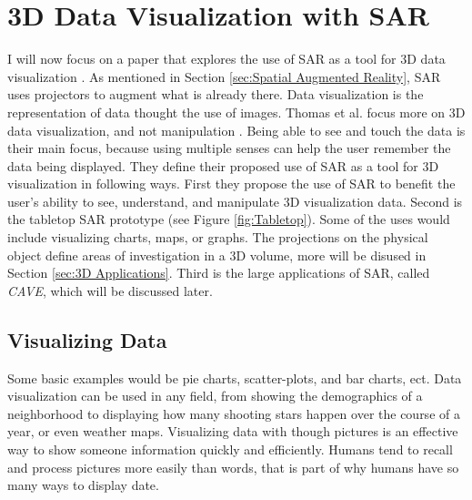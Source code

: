 \documentclass{sig-alternate}
\begin{document}
\section{3D Data Visualization with SAR}
\label{sec:3D Data Visualization}
I will now focus on a paper that explores the use of SAR as a tool for 3D data visualization \cite{3D}. As mentioned in Section \ref{sec:Spatial Augmented Reality}, SAR uses projectors to augment what is already there. Data visualization is the representation of data thought the use of images. Thomas et al. focus more on 3D data visualization, and not manipulation \cite{3D}. Being able to see and touch the data is their main focus, because using multiple senses can help the user remember the data being displayed. They define their proposed use of SAR as a tool for 3D visualization in following ways. First they propose the use of SAR to benefit the user's ability to see, understand, and manipulate 3D visualization data. Second is the tabletop SAR prototype (see Figure \ref{fig:Tabletop}). Some of the uses would include visualizing charts, maps, or graphs. The projections on the physical object define areas of investigation in a 3D volume, more will be disused in Section \ref{sec:3D Applications}. Third is the large applications of SAR, called \textit{CAVE}, which will be discussed later.

\subsection{Visualizing Data}
\label{sec:Visualizing Data}
Some basic examples would be pie charts, scatter-plots, and bar charts, ect. Data visualization can be used in any field, from showing the demographics of a neighborhood to displaying how many shooting stars happen over the course of a year, or even weather maps. Visualizing data with though pictures is an effective way to show someone information quickly and efficiently. Humans tend to recall and process pictures more easily than words, that is part of why humans have so many ways to display date.   
\end{document}
